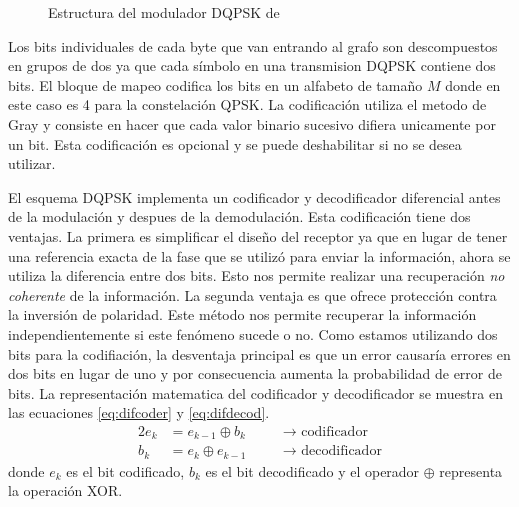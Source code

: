 \begin{figure}[bp]
  \centering
  \vspace{0.5in}
  \vspace{0.3in}
  \caption{Estructura del modulador DQPSK de \gnuradio}
  \label{fig:dqpsk}
\end{figure}

Los bits individuales de cada byte que van entrando al grafo son descompuestos en grupos de dos ya
que cada s\'imbolo en una transmision DQPSK contiene dos bits. El bloque de mapeo codifica los bits
en un alfabeto de tama\~no $M$ donde en este caso es 4 para la constelaci\'on QPSK. La
codificaci\'on utiliza el metodo de Gray y consiste en hacer que cada valor binario sucesivo difiera
unicamente por un bit. Esta codificaci\'on es opcional y se puede deshabilitar si no se desea utilizar. 

El esquema DQPSK implementa un codificador y decodificador diferencial antes de la modulaci\'on y
despues de la demodulaci\'on. Esta codificaci\'on tiene dos ventajas. La primera es simplificar el
dise\~no del receptor ya que en lugar de tener una referencia exacta de la fase que se utiliz\'o
para enviar la informaci\'on, ahora se utiliza la diferencia entre dos bits. Esto nos
permite realizar una recuperaci\'on \emph{no coherente} de la informaci\'on. La segunda ventaja es que
ofrece protecci\'on contra la inversi\'on de polaridad. Este m\'etodo nos permite recuperar la
informaci\'on independientemente si este fen\'omeno sucede o no. Como estamos utilizando dos bits
para la codifiaci\'on, la desventaja principal es que un error causar\'ia errores en dos bits en
lugar de uno y por consecuencia aumenta la probabilidad de error de bits. La representaci\'on
matematica del codificador y decodificador se muestra en las ecuaciones \eqref{eq:difcoder} y
\eqref{eq:difdecod}.
\begin{alignat}{2}
e_k &=e_{k-1}\oplus b_k &\quad &\rightarrow \text{ codificador}\label{eq:difcoder}\\
b_k &=e_k \oplus e_{k-1} &\quad &\rightarrow \text{ decodificador}\label{eq:difdecod}
\end{alignat}
donde $e_k$ es el bit codificado, $b_k$ es el bit decodificado y el operador $\oplus$ representa la
operaci\'on XOR.

